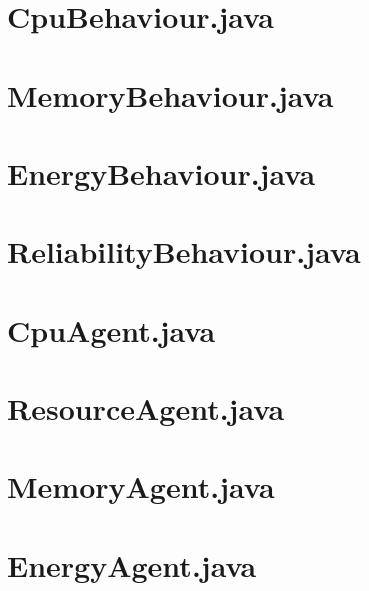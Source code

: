 \section{CpuBehaviour.java}


\section{MemoryBehaviour.java}


\section{EnergyBehaviour.java}


\section{ReliabilityBehaviour.java}


\section{CpuAgent.java}


\section{ResourceAgent.java}


\section{MemoryAgent.java}


\section{EnergyAgent.java}


